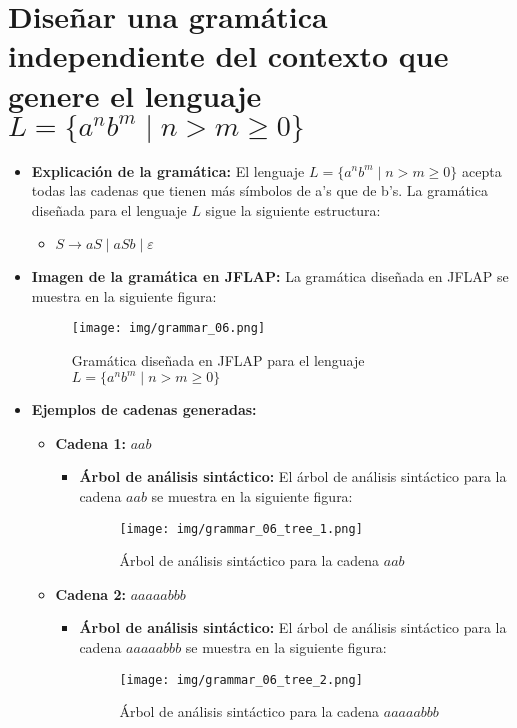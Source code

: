 \documentclass[11pt]{report}
\begin{document}
\section{Diseñar una gramática independiente del contexto que genere el lenguaje \texorpdfstring{$L = \{a^n b^m \mid n > m \geq 0\}$}{L = \{a^n b^m | n > m ≥ 0\}}}
\begin{itemize}
  \item \textbf{Explicación de la gramática:} El lenguaje $L = \{a^n b^m \mid n > m \geq 0\}$ acepta todas las cadenas que tienen más símbolos de a's que de b's. La gramática diseñada para el lenguaje $L$ sigue la siguiente estructura:
  \begin{itemize}
    \item $S \rightarrow aS \mid aSb \mid \varepsilon$
  \end{itemize}
  \item \textbf{Imagen de la gramática en JFLAP:} La gramática diseñada en JFLAP se muestra en la siguiente figura:
  \begin{figure}[H]
    \centering
    \texttt{[image: img/grammar\_06.png]}
    \caption{Gramática diseñada en JFLAP para el lenguaje $L = \{a^n b^m \mid n > m \geq 0\}$}
  \end{figure}
  \item \textbf{Ejemplos de cadenas generadas:}
  \begin{itemize}
    \item \textbf{Cadena 1:} $aab$
    \begin{itemize}
      \item \textbf{Árbol de análisis sintáctico:} El árbol de análisis sintáctico para la cadena $aab$ se muestra en la siguiente figura:
      \begin{figure}[H]
        \centering
        \texttt{[image: img/grammar\_06\_tree\_1.png]}
        \caption{Árbol de análisis sintáctico para la cadena $aab$}
        \label{fig:arbol16}
      \end{figure}
    \end{itemize}
    \item \textbf{Cadena 2:} $aaaaabbb$
    \begin{itemize}
      \item \textbf{Árbol de análisis sintáctico:} El árbol de análisis sintáctico para la cadena $aaaaabbb$ se muestra en la siguiente figura:
      \begin{figure}[H]
        \centering
        \texttt{[image: img/grammar\_06\_tree\_2.png]}
        \caption{Árbol de análisis sintáctico para la cadena $aaaaabbb$}

\end{figure}
\end{itemize}
\end{itemize}
\end{itemize}
\end{document}
